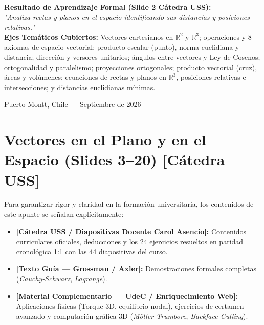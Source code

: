 \documentclass[10pt,letterpaper]{article}
\begin{document}
\begin{titlepage}
    \begin{tcolorbox}[colback=USSGoldLight, colframe=USSGold, width=0.92\linewidth, arc=2.5mm, boxrule=1pt]
        \sffamily\small
        \textbf{Resultado de Aprendizaje Formal (Slide 2 Cátedra USS):}\\
        \textit{"Analiza rectas y planos en el espacio identificando sus distancias y posiciones relativas."}\\[0.2cm]
        \textbf{Ejes Temáticos Cubiertos:}
        Vectores cartesianos en $\mathbb{R}^2$ y $\mathbb{R}^3$; operaciones y 8 axiomas de espacio vectorial; producto escalar (punto), norma euclidiana y distancia; dirección y versores unitarios; ángulos entre vectores y Ley de Cosenos; ortogonalidad y paralelismo; proyecciones ortogonales; producto vectorial (cruz), áreas y volúmenes; ecuaciones de rectas y planos en $\mathbb{R}^3$, posiciones relativas e intersecciones; y distancias euclidianas mínimas.
    \end{tcolorbox}

    \vfill
    {\footnotesize\sffamily\color{USSDark!70} Puerto Montt, Chile --- Septiembre de 2026}
\end{titlepage}

\newpage
\tableofcontents
\newpage

\section{Vectores en el Plano y en el Espacio (Slides 3--20) [Cátedra USS]}

\begin{cajaNota}
Para garantizar rigor y claridad en la formación universitaria, los contenidos de este apunte se señalan explícitamente:
\begin{itemize}
    \item \textbf{[Cátedra USS / Diapositivas Docente Carol Asencio]:} Contenidos curriculares oficiales, deducciones y los 24 ejercicios resueltos en paridad cronológica 1:1 con las 44 diapositivas del curso.
    \item \textbf{[Texto Guía --- Grossman / Axler]:} Demostraciones formales completas (\textit{Cauchy-Schwarz}, \textit{Lagrange}).
    \item \textbf{[Material Complementario --- UdeC / Enriquecimiento Web]:} Aplicaciones físicas (Torque 3D, equilibrio nodal), ejercicios de certamen avanzado y computación gráfica 3D (\textit{Möller-Trumbore}, \textit{Backface Culling}).
\end{itemize}
\end{cajaNota}
\end{document}
